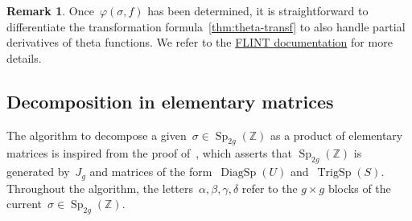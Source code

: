 \documentclass[12pt,oneside]{amsart}
\numberwithin{equation}{section}
\theoremstyle{definition}
\newtheorem{rem}[equation]{Remark}
\newcommand{\Z}{\mathbb{Z}}
\renewcommand{\phi}{\varphi}
\DeclareMathOperator{\Sp}{Sp}
\DeclareMathOperator{\TrigSp}{TrigSp}
\DeclareMathOperator{\DiagSp}{DiagSp}
\begin{document}
\begin{rem}
  Once~$\phi(\sigma,f)$ has been determined, it is straightforward to
  differentiate the transformation formula~\ref{thm:theta-transf} to also
  handle partial derivatives of theta functions. We refer to the
  \href{https://flintlib.org/doc/acb_theta.html#c.acb_theta_jet}{FLINT
    documentation} for more details.
\end{rem}

\subsection{Decomposition in elementary matrices}
\label{subsec:decomp}

The algorithm to decompose a given~$\sigma\in \Sp_{2g}(\Z)$ as a product of
elementary matrices is inspired from the proof of~\cite[Lemma 15
p.\,45]{igusaThetaFunctions1972}, which asserts that $\Sp_{2g}(\Z)$ is
generated by~$J_g$ and matrices of the form~$\DiagSp(U)$
and~$\TrigSp(S)$. Throughout the algorithm, the
letters~$\alpha,\beta,\gamma,\delta$ refer to the $g\times g$ blocks of the
current~$\sigma\in \Sp_{2g}(\Z)$.
\end{document}
